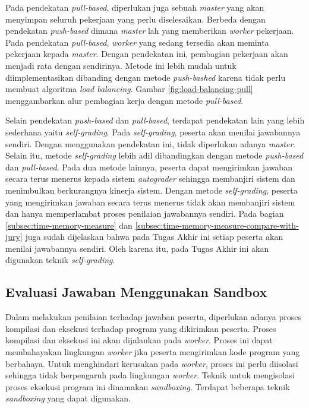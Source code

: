 \par Pada pendekatan \textit{pull-based}, diperlukan juga sebuah \textit{master} yang akan menyimpan seluruh pekerjaan yang perlu diselesaikan. Berbeda dengan pendekatan \textit{push-based} dimana \textit{master} lah yang memberikan \textit{worker} pekerjaan. Pada pendekatan \textit{pull-based}, \textit{worker} yang sedang tersedia akan meminta pekerjaan kepada \textit{master}. Dengan pendekatan ini, pembagian pekerjaan akan menjadi rata dengan sendirinya. Metode ini lebih mudah untuk diimplementasikan dibanding dengan metode \textit{push-bashed} karena tidak perlu membuat algoritma \textit{load balancing}. Gambar \ref{fig:load-balancing-pull} menggambarkan alur pembagian kerja dengan metode \textit{pull-based}.

\par Selain pendekatan \textit{push-based} dan \textit{pull-based}, terdapat pendekatan lain yang lebih sederhana yaitu \textit{self-grading}. Pada \textit{self-grading}, peserta akan menilai jawabannya sendiri. Dengan menggunakan pendekatan ini, tidak diperlukan adanya \textit{master}. Selain itu, metode \textit{self-grading} lebih adil dibandingkan dengan metode \textit{push-based} dan \textit{pull-based}. Pada dua metode lainnya, peserta dapat mengirimkan jawaban secara terus menerus kepada sistem \textit{autograder} sehingga membanjiri sistem dan menimbulkan berkurangnya kinerja sistem. Dengan metode \textit{self-grading}, peserta yang mengirimkan jawaban secara terus menerus tidak akan membanjiri sistem dan hanya memperlambat proses penilaian jawabannya sendiri. Pada bagian \ref{subsec:time-memory-measure} dan \ref{subsec:time-memory-measure-compare-with-jury} juga sudah dijelaskan bahwa pada Tugas Akhir ini setiap peserta akan menilai jawabannya sendiri. Oleh karena itu, pada Tugas Akhir ini akan digunakan teknik \textit{self-grading}. 

\subsection{Evaluasi Jawaban Menggunakan Sandbox}

\par Dalam melakukan penilaian terhadap jawaban peserta, diperlukan adanya proses kompilasi dan eksekusi terhadap program yang dikirimkan peserta. Proses kompilasi dan eksekusi ini akan dijalankan pada \textit{worker}. Proses ini dapat membahayakan lingkungan \textit{worker} jika peserta mengirimkan kode program yang berbahaya. Untuk menghindari kerusakan pada \textit{worker}, proses ini perlu diisolasi sehingga tidak berpengaruh pada lingkungan \textit{worker}. Teknik untuk mengisolasi proses eksekusi program ini dinamakan \textit{sandboxing}. Terdapat beberapa teknik \textit{sandboxing} yang dapat digunakan.

